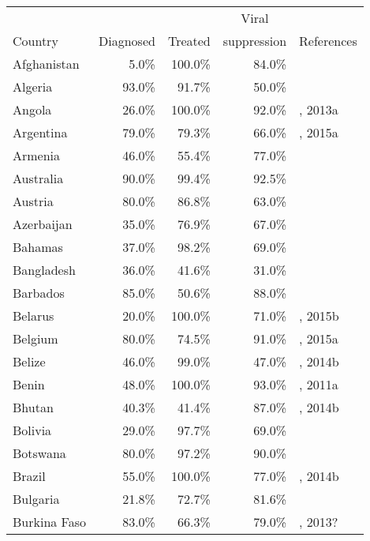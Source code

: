 \begin{longtable}{lrrrl}
 \hline  
 & & & \multicolumn{1}{c}{Viral} \\
  Country & \multicolumn{1}{l}{Diagnosed}
  & \multicolumn{1}{l}{Treated} & \multicolumn{1}{l}{suppression}
  & References \\
  \hline
  Afghanistan & 5.0\% & 100.0\% & 84.0\% & \cite{Unaids2016-an} \\
  Algeria & 93.0\% & 91.7\% & 50.0\% & \cite{Unaids2016-an} \\
  Angola & 26.0\% & 100.0\% & 92.0\% & \cite{Unaids2016-an}, 2013a \\
  Argentina & 79.0\% & 79.3\% & 66.0\% & \cite{Unaids2016-an}, 2015a \\
  Armenia & 46.0\% & 55.4\% & 77.0\% & \cite{Unaids2016-an} \\
  Australia & 90.0\% & 99.4\% & 92.5\% & \cite{Unaids2016-an, kirby2014}  \\
  Austria & 80.0\% & 86.8\% & 63.0\% & \cite{ahivcos2015} \\
  Azerbaijan & 35.0\% & 76.9\% & 67.0\% & \cite{Unaids2016-an} \\
  Bahamas & 37.0\% & 98.2\% & 69.0\% & \cite{Unaids2016-an} \\
  Bangladesh & 36.0\% & 41.6\% & 31.0\% & \cite{Unaids2016-an} \\
  Barbados & 85.0\% & 50.6\% & 88.0\% & \cite{Unaids2016-an} \\
  Belarus & 20.0\% & 100.0\% & 71.0\% & \cite{Unaids2016-an}, 2015b \\
  Belgium & 80.0\% & 74.5\% & 91.0\% & \cite{Unaids2016-an,europa2012}, 2015a \\
  Belize & 46.0\% & 99.0\% & 47.0\% & \cite{Unaids2016-an}, 2014b \\
  Benin & 48.0\% & 100.0\% & 93.0\% & \cite{Unaids2016-an}, 2011a \\
  Bhutan & 40.3\% & 41.4\% & 87.0\% & \cite{Unaids2016-an, Unaids2016-am}, 2014b \\
  Bolivia & 29.0\% & 97.7\% & 69.0\% & \cite{Unaids2016-an} \\
  Botswana & 80.0\% & 97.2\% & 90.0\% & \cite{Unaids2016-an} \\
  Brazil & 55.0\% & 100.0\% & 77.0\% & \cite{Unaids2016-an}, 2014b \\
  Bulgaria & 21.8\% & 72.7\% & 81.6\% & \cite{Unaids2016-an, Unaids2016-am}\\
  Burkina Faso & 83.0\% & 66.3\% & 79.0\% & \cite{Unaids2016-an}, 2013? \\

\end{longtable}
